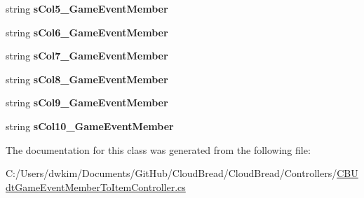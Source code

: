 \begin{DoxyCompactItemize}
\item 
string {\bfseries s\+Col5\+\_\+\+Game\+Event\+Member}\hypertarget{a00108_abb91ddc71863043f8dda23f07e6fbb6a}{}\label{a00108_abb91ddc71863043f8dda23f07e6fbb6a}

\item 
string {\bfseries s\+Col6\+\_\+\+Game\+Event\+Member}\hypertarget{a00108_a599675cf9cd1f1bb2b7347caf242b01f}{}\label{a00108_a599675cf9cd1f1bb2b7347caf242b01f}

\item 
string {\bfseries s\+Col7\+\_\+\+Game\+Event\+Member}\hypertarget{a00108_af23ce15d5f5918964a956246f305727e}{}\label{a00108_af23ce15d5f5918964a956246f305727e}

\item 
string {\bfseries s\+Col8\+\_\+\+Game\+Event\+Member}\hypertarget{a00108_a1788dfeebff0444d785381fd9f4262a7}{}\label{a00108_a1788dfeebff0444d785381fd9f4262a7}

\item 
string {\bfseries s\+Col9\+\_\+\+Game\+Event\+Member}\hypertarget{a00108_ad574a994a7dd1c2d7f606e4fab5b6dc3}{}\label{a00108_ad574a994a7dd1c2d7f606e4fab5b6dc3}

\item 
string {\bfseries s\+Col10\+\_\+\+Game\+Event\+Member}\hypertarget{a00108_a04f4e983353a8aa04fb615dbcdbbc25d}{}\label{a00108_a04f4e983353a8aa04fb615dbcdbbc25d}

\end{DoxyCompactItemize}


The documentation for this class was generated from the following file\+:\begin{DoxyCompactItemize}
\item 
C\+:/\+Users/dwkim/\+Documents/\+Git\+Hub/\+Cloud\+Bread/\+Cloud\+Bread/\+Controllers/\hyperlink{a00229}{C\+B\+Udt\+Game\+Event\+Member\+To\+Item\+Controller.\+cs}\end{DoxyCompactItemize}
